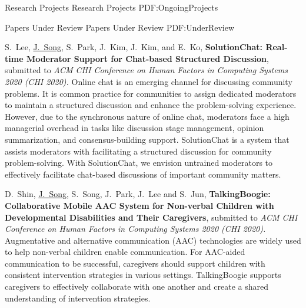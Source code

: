\documentclass[letterpaper,MMMyyyy,nonstopmode]{template}
\begin{document}
\begin{Body}
\endgroup

\newpage


\BigGap
\Section
{Research Projects}
{Research Projects}
{PDF:OngoingProjects}

\SubSection
{Papers Under Review}
{Papers Under Review}
{PDF:UnderReview}

\begingroup
\renewcommand{\MaxNumberedItem}{[88]}

\BigGap
\NumberedItem{[3]}
  S.~Lee, \underline{J.~Song}, S.~Park, J.~Kim, J.~Kim, and E.~Ko,
  \textbf{SolutionChat: Real-time Moderator Support for Chat-based Structured Discussion},
  submitted to \textit{ACM CHI Conference on Human Factors in Computing Systems 2020 (CHI 2020).}
  \vspace{2mm}\newline
  {\small{
    Online chat is an emerging channel for discussing community problems. It is common practice for communities to assign dedicated moderators to maintain a structured discussion and enhance the problem-solving experience. However, due to the synchronous nature of online chat, moderators face a high managerial overhead in tasks like discussion stage management, opinion summarization, and consensus-building support. SolutionChat is a system that assists moderators with facilitating a structured discussion for community problem-solving.
    With SolutionChat, we envision untrained moderators to effectively facilitate chat-based discussions of important community matters.
  }}


\BigGap
\NumberedItem{[4]}
  D.~Shin, \underline{J.~Song}, S.~Song, J.~Park, J.~Lee and S.~Jun,
  \textbf{TalkingBoogie: Collaborative Mobile AAC System for Non-verbal Children with Developmental Disabilities and Their Caregivers},
  submitted to \textit{ACM CHI Conference on Human Factors in Computing Systems 2020 (CHI 2020).}
  \vspace{2mm}\newline
  {\small{
    Augmentative and alternative communication (AAC) technologies are widely used to help non-verbal children enable communication. For AAC-aided communication to be successful, caregivers should support children with consistent intervention strategies in various settings. TalkingBoogie supports caregivers to effectively collaborate with one another and create a shared understanding of intervention strategies.
  }}


\end{Body}
\end{document}

